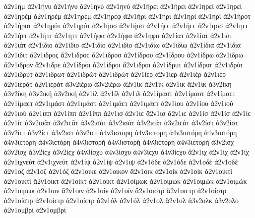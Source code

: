 {ἀ2ν1ημ 
ἀ2ν1ήνυ ἀ2ν1ήνυ   %
ἀ2ν1ηνύ ἀ2ν1ηνύ 
ἀ2ν1ήρει ἀ2ν1ήρει   %
ἀ2ν1ηρεί ἀ2ν1ηρεί 
ἀ2ν1ηρέμ ἀ2ν1ηρέμ   %
ἀ2ν1ηρεμ 
ἀ2ν1ηρεφ   %
ἀ2ν1ήρι ἀ2ν1ήρι   %
ἀ2ν1ηρί ἀ2ν1ηρί 
ἀ2ν1ήροτ ἀ2ν1ήροτ   %
ἀ2ν1ηρότ ἀ2ν1ηρότ 
ἀ2ν1ήσσ ἀ2ν1ήσσ ἀ2ν1ήϲϲ ἀ2ν1ήϲϲ   %
ἀ2ν1ησσ ἀ2ν1ηϲϲ 
ἀ2ν1ήττ ἀ2ν1ήττ   %
ἀ2ν1ηττ 
ἀ2ν1ήφα ἀ2ν1ήφα   %
ἀ2ν1ηφα 
ἀ2ν1ίατ ἀ2ν1ίατ   %
ἀ2ν1ιάτ ἀ2ν1ιάτ 
ἀ2ν1ίδιο ἀ2ν1ίδιο   %
ἀ2ν1ιδίο ἀ2ν1ιδίο 
ἀ2ν1ιδίω ἀ2ν1ιδίω 
ἀ2ν1ίδια ἀ2ν1ίδια 
ἀ2ν1ιδιτ   %
ἄ2ν1ιδρος ἄ2ν1ιδροϲ   %
ἄ2ν1ιδροσ 
ἀ2ν1ίδρου ἀ2ν1ίδρου 
ἀ2ν1ίδρω ἀ2ν1ίδρω 
ἄ2ν1ιδρον 
ἄ2ν1ιδρε 
ἀ2ν1ίδροι ἀ2ν1ίδροι 
ἄ2ν1ιδροι 
ἀ2ν1ίδρυτ ἀ2ν1ίδρυτ   %
ἀ2ν1ιδρύτ ἀ2ν1ιδρύτ 
ἀ2ν1ιδρωτ   %
ἀ2ν1ιδρώτ ἀ2ν1ιδρώτ   %
ἀ2ν1ίερ ἀ2ν1ίερ   %
ἀ2ν1ιέρ ἀ2ν1ιέρ 
ἀ2ν1ιεράτ ἀ2ν1ιεράτ   %
ἀ3ν2ιέρω ἀ3ν2ιέρω   %
ἀ2ν1ίκ ἀ2ν1ίκ   %
ἀ2ν1ικ 
ἄ2ν1ικ   %
ἀ3ν2ίκη ἀ3ν2ίκη   %
ἀ3ν2ική ἀ3ν2ική 
ἀ2ν1ίλ ἀ2ν1ίλ   %
ἀ2ν1ιλ 
ἀ2ν1ίμαστ ἀ2ν1ίμαστ ἀ2ν1ίμαϲτ ἀ2ν1ίμαϲτ   %
ἀ2ν1ιμάστ ἀ2ν1ιμάστ ἀ2ν1ιμάϲτ ἀ2ν1ιμάϲτ 
ἀ2ν1ίου ἀ2ν1ίου   %
ἀ2ν1ιού ἀ2ν1ιού 
ἄ2ν1ιππ   %
ἀ2ν1ίππ ἀ2ν1ίππ 
ἀ2ν1ισ ἀ2ν1ιϲ   %
ἄ2ν1ισ ἄ2ν1ιϲ   %
ἀ2ν1ίσ ἀ2ν1ίσ ἀ2ν1ίϲ ἀ2ν1ίϲ 
ἀ3ν2ισᾶτ ἀ3ν2ιϲᾶτ   %
ἀ3ν2ισάτ ἀ3ν2ισάτ ἀ3ν2ιϲάτ ἀ3ν2ιϲάτ 
ἀ3ν2ίστ ἀ3ν2ίστ ἀ3ν2ίϲτ ἀ3ν2ίϲτ   %
ἀ3ν2ιστ ἀ3ν2ιϲτ 
ἀ4ν3ιστορη ἀ4ν3ιϲτορη   %
ἀ4ν3ιστόρη ἀ4ν3ιστόρη ἀ4ν3ιϲτόρη ἀ4ν3ιϲτόρη   %
ἀ4ν3ιστορή ἀ4ν3ιστορή ἀ4ν3ιϲτορή ἀ4ν3ιϲτορή 
ἀ3ν2ίσχ ἀ3ν2ίσχ ἀ3ν2ίϲχ ἀ3ν2ίϲχ   %
ἀ4ν3ίσχυ ἀ4ν3ίσχυ ἀ4ν3ίϲχυ ἀ4ν3ίϲχυ   %
ἄ2ν1ιχ   %
ἀ2ν1ίχ ἀ2ν1ίχ 
ἀ2ν1ιχνεύτ ἀ2ν1ιχνεύτ   %
ἀ2ν1ίψ ἀ2ν1ίψ   %
ἀ2ν1ιψ 
ἀ2ν1όδε ἀ2ν1όδε   %
ἀ2ν1οδέ ἀ2ν1οδέ 
ἄ2ν1οζ   %
ἀ2ν1όζ ἀ2ν1όζ 
ἀ2ν1οικε   %
ἀ2ν1οικον   %
ἄ2ν1οικ   %
ἀ2ν1οίκ ἀ2ν1οίκ 
ἀ2ν1οικτί ἀ2ν1οικτί   %
ἄ2ν1οικτ   %
ἀ2ν1οίκτ ἀ2ν1οίκτ 
ἀ2ν1οίμωκ ἀ2ν1οίμωκ   %
ἀ2ν1οιμώκ ἀ2ν1οιμώκ 
ἀ2ν1οιμωκ   %
ἀ2ν1οιν   %
ἄ2ν1οιν   %
ἀ2ν1οίν ἀ2ν1οίν 
ἄ2ν1οιστρ ἄ2ν1οιϲτρ   %
ἀ2ν1οίστρ ἀ2ν1οίστρ ἀ2ν1οίϲτρ ἀ2ν1οίϲτρ 
ἀ2ν1όλ ἀ2ν1όλ   %
ἀ2ν1ολ 
ἄ2ν1ολ   %
ἀ3ν2ολκ   %
ἀ3ν2ολο   %
ἀ2ν1ομβρί ἀ2ν1ομβρί   %
}
